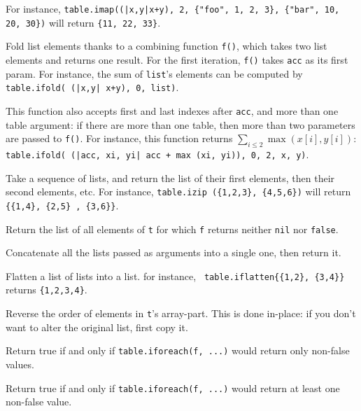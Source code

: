 For instance, {\tt table.imap((|x,y|x+y), 2, \{"foo", 1, 2, 3\},
  \{"bar", 10, 20, 30\})} will return {\tt\{11, 22, 33\}}.


Fold list elements thanks to a combining function {\tt f()}, which
takes two list elements and returns one result. For the first
iteration, {\tt f()} takes {\tt acc} as its first param. For instance,
the sum of {\tt list}'s elements can be computed by {\tt table.ifold(
  (|x,y| x+y), 0, list)}.

This function also accepts first and last indexes after {\tt acc}, and
more than one table argument: if there are more than one table, then
more than two parameters are passed to {\tt f()}. For instance, this
function returns $\sum_{i\le2} \max(x[i], y[i])$: {\tt
  table.ifold( (|acc, xi, yi| acc + max (xi, yi)), 0, 2, x, y)}.


Take a sequence of lists, and return the
list of their first elements, then their second elements, etc. For
instance, {\tt table.izip (\{1,2,3\}, \{4,5,6\})} will return
{\tt\{\{1,4\}, \{2,5\} , \{3,6\}\}}.


Return the list of all elements of {\tt t} for which {\tt f} returns
neither {\tt nil} nor {\tt false}.


Concatenate all the lists passed as arguments into a single one, then
return it.


Flatten a list of lists into a list. for instance, {\tt
  table.iflatten\{\{1,2\}, \{3,4\}\}} returns {\tt\{1,2,3,4\}}.

Reverse the order of elements in {\tt t}'s array-part. This is done
in-place: if you don't want to alter the original list, first copy
it.


Return true if and only if {\tt table.iforeach(f, ...)} would return only
non-false values.


Return true if and only if {\tt table.iforeach(f, ...)} would return
at least one non-false value.


